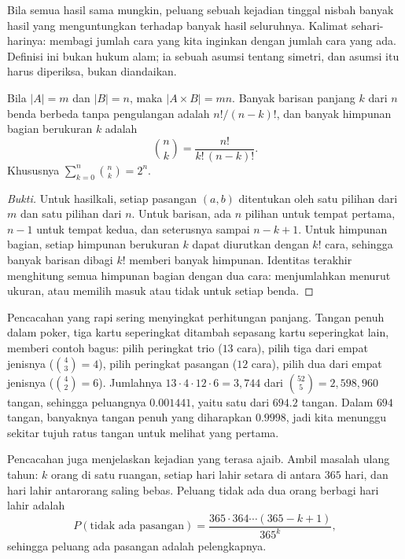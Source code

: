Bila semua hasil sama mungkin, peluang sebuah kejadian tinggal nisbah banyak hasil yang
menguntungkan terhadap banyak hasil seluruhnya. Kalimat sehari-harinya: membagi jumlah
cara yang kita inginkan dengan jumlah cara yang ada. Definisi ini bukan hukum alam; ia
sebuah asumsi tentang simetri, dan asumsi itu harus diperiksa, bukan diandaikan.



\begin{proposisi}
Bila $|A|=m$ dan $|B|=n$, maka $|A\times B|=mn$. Banyak barisan panjang $k$ dari $n$
benda berbeda tanpa pengulangan adalah $n!/(n-k)!$, dan banyak himpunan bagian
berukuran $k$ adalah
\[
\binom{n}{k}=\frac{n!}{k!\,(n-k)!}.
\]
Khususnya $\sum_{k=0}^{n}\binom{n}{k}=2^{n}$.
\end{proposisi}

\begin{proof}[Bukti]
Untuk hasilkali, setiap pasangan $(a,b)$ ditentukan oleh satu pilihan dari $m$ dan satu
pilihan dari $n$. Untuk barisan, ada $n$ pilihan untuk tempat pertama, $n-1$ untuk
tempat kedua, dan seterusnya sampai $n-k+1$. Untuk himpunan bagian, setiap himpunan
berukuran $k$ dapat diurutkan dengan $k!$ cara, sehingga banyak barisan dibagi $k!$
memberi banyak himpunan. Identitas terakhir menghitung semua himpunan bagian dengan dua
cara: menjumlahkan menurut ukuran, atau memilih masuk atau tidak untuk setiap benda.
\end{proof}

Pencacahan yang rapi sering menyingkat perhitungan panjang. Tangan penuh dalam poker,
tiga kartu seperingkat ditambah sepasang kartu seperingkat lain, memberi contoh bagus:
pilih peringkat trio ($13$ cara), pilih tiga dari empat jenisnya ($\binom{4}{3}=4$),
pilih peringkat pasangan ($12$ cara), pilih dua dari empat jenisnya ($\binom{4}{2}=6$).
Jumlahnya $13\cdot 4\cdot 12\cdot 6=3{,}744$ dari $\binom{52}{5}=2{,}598{,}960$ tangan,
sehingga peluangnya $0.001441$, yaitu satu dari $694.2$ tangan. Dalam $694$ tangan,
banyaknya tangan penuh yang diharapkan $0.9998$, jadi kita menunggu sekitar tujuh ratus
tangan untuk melihat yang pertama.

Pencacahan juga menjelaskan kejadian yang terasa ajaib. Ambil masalah ulang tahun:
$k$ orang di satu ruangan, setiap hari lahir setara di antara $365$ hari, dan hari
lahir antarorang saling bebas. Peluang tidak ada dua orang berbagi hari lahir adalah
\[
P(\text{tidak ada pasangan})=\frac{365\cdot 364\cdots (365-k+1)}{365^{k}},
\]
sehingga peluang ada pasangan adalah pelengkapnya.

